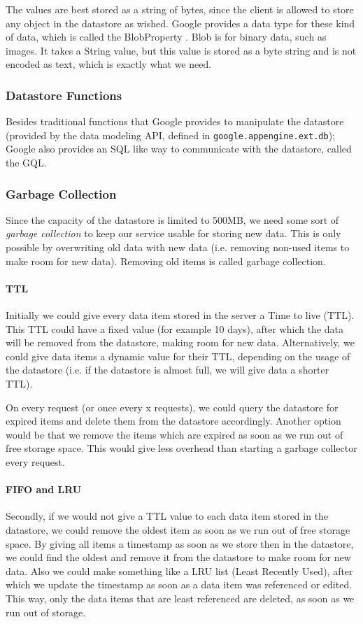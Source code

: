 The values are best stored as a string of bytes, since the client is allowed to
store any object in the datastore as wished. Google provides a data type for
these kind of data, which is called the BlobProperty . Blob is for binary data,
such as images. It takes a String value, but this value is stored as a byte
string and is not encoded as text, which is exactly what we need.

\subsubsection{Datastore Functions}
Besides traditional functions that Google provides to manipulate the datastore
(provided by the data modeling API, defined in \texttt{google.appengine.ext.db});
Google also provides an SQL like way to communicate with the datastore, called
the GQL.

\subsubsection{Garbage Collection}
Since the capacity of the datastore is limited to 500MB, we need some sort of
\emph{garbage collection} to keep our service usable for storing new data. This
is only possible by overwriting old data with new data (i.e. removing non-used
items to make room for new data). Removing old items is called garbage
collection.

\paragraph{TTL}
Initially we could give every data item stored in the server a Time to live
(TTL). This TTL could have a fixed value (for example 10 days), after which the
data will be removed from the datastore, making room for new data. Alternatively,
we could give data items a dynamic value for their TTL, depending on the usage of
the datastore (i.e. if the datastore is almost full, we will give data a shorter
TTL).

On every request (or once every x requests), we could query the datastore for
expired items and delete them from the datastore accordingly. Another option
would be that we remove the items which are expired as soon as we run out of free
storage space. This would give less overhead than starting a garbage collector
every request.

\paragraph{FIFO and LRU}
Secondly, if we would not give a TTL value to each data item stored in the
datastore, we could remove the oldest item as soon as we run out of free storage
space. By giving all items a timestamp as soon as we store then in the datastore,
we could find the oldest and remove it from the datastore to make room for new
data. Also we could make something like a LRU list (Least Recently Used), after
which we update the timestamp as soon as a data item was referenced or edited.
This way, only the data items that are least referenced are deleted, as soon as
we run out of storage.

